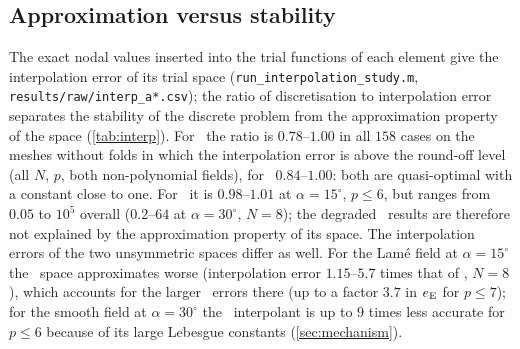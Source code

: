 \begin{table}[p]
  \centering\small
  \begin{minipage}[t]{0.48\linewidth}\centering
    \label{tab:rates-smooth-E}
    \resizebox{\linewidth}{!}{}
  \end{minipage}\hfill
  \begin{minipage}[t]{0.48\linewidth}\centering
    \label{tab:rates-lame-E}
    \resizebox{\linewidth}{!}{}
  \end{minipage}

  \vspace{4mm}
  \begin{minipage}[t]{0.48\linewidth}\centering
    \label{tab:rates-smooth-N}
    \resizebox{\linewidth}{!}{}
  \end{minipage}\hfill
  \begin{minipage}[t]{0.48\linewidth}\centering
    \label{tab:rates-lame-N}
    \resizebox{\linewidth}{!}{}
  \end{minipage}
\end{table}

\subsection{Approximation versus stability}\label{sec:interp}
The exact nodal values inserted into the trial functions of each element give the
interpolation error of its trial space (\texttt{run\_interpolation\_study.m},
\texttt{results/raw/interp\_a*.csv}); the ratio of discretisation to interpolation error
separates the stability of the discrete problem from the approximation property of the
space (\cref{tab:interp}). For \PH\ the ratio is $0.78$--$1.00$ in all $158$ cases on the meshes
without folds in which the interpolation error is above the round-off level (all $N$, $p$, both
non-polynomial fields), for \PP\ $0.84$--$1.00$: both are quasi-optimal with a constant close to
one. For \PM\ it is $0.98$--$1.01$ at $\alpha=15^\circ$, $p\le6$, but ranges from $0.05$ to $10^5$
overall ($0.2$--$64$ at $\alpha=30^\circ$, $N=8$); the degraded \PM\ results are therefore not
explained by the approximation property of its space. The interpolation errors of the two
unsymmetric spaces differ as well. For the Lam\'e field at $\alpha=15^\circ$ the \PH\ space
approximates worse (interpolation error $1.15$--$5.7$ times that of \PM, $N=8$), which accounts for
the larger \PH\ errors there (up to a factor $3.7$ in $e_{\mathrm{E}}$ for $p\le7$); for the smooth field
at $\alpha=30^\circ$ the \PM\ interpolant is up to $9$ times less accurate for $p\le6$
because of its large Lebesgue constants (\cref{sec:mechanism}).

